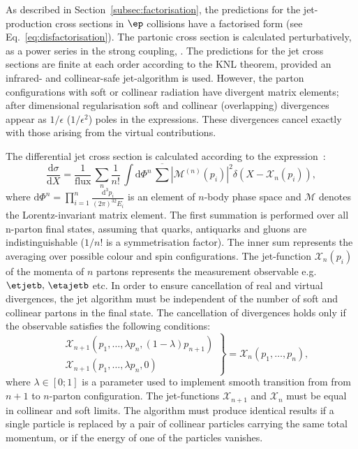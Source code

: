 As described in Section~\ref{subsec:factorisation}, the predictions for the jet-production cross sections in $\ep$ collisions have a factorised form (see Eq.~\eqref{eq:disfactorisation}). The partonic cross section is calculated perturbatively, as a power series in the strong coupling, \as. The predictions for the jet cross sections are finite at each order according to the KNL theorem\cite{Kinoshita:1962ur,Lee:1964is}, provided an infrared- and collinear-safe jet-algorithm is used. However, the parton configurations with soft or collinear radiation have divergent matrix elements; after dimensional regularisation soft and collinear (overlapping) divergences appear as $1/\epsilon$ ($1/\epsilon^2$) poles in the expressions. These divergences cancel exactly with those arising from the virtual contributions.

The differential jet cross section is calculated according to the expression~\cite{PDG:2014}:
\begin{equation}
\frac{\mathrm{d}\sigma}{\mathrm{d}X} = \frac{1}{\text{flux}}\, \sum_n{ \frac{1}{n!} \, \int{\mathrm{d}\Phi^{n}} \, \overline{\sum}{ \left| \mathcal{M}^{\left(n\right)}\left(p_i\right) \right|^2 } \delta\left( X - \mathcal{X}_n\left( p_i\right)\right)},
\label{eq:pqcdxs}
\end{equation}
where $\mathrm{d}\Phi^{n}=\prod_{i=1}^{n}\frac{\mathrm{d^3}p_i}{\left(2\pi\right)^32E_i}$ is an element of $n$-body phase space and $\mathcal{M}$ denotes the Lorentz-invariant matrix element. The first summation is performed over all n-parton final states, assuming that quarks, antiquarks and gluons are indistinguishable ($1/n!$ is a symmetrisation factor). The inner sum represents the averaging over possible colour and spin configurations. The jet-function $\mathcal{X}_n\left( p_i\right)$ of the momenta of $n$ partons represents the measurement observable e.g. $\etjetb,\,\etajetb$ etc. In order to ensure cancellation of real and virtual divergences, the jet algorithm must be independent of the number of soft and collinear partons in the final state. The cancellation of divergences holds only if the observable satisfies the following conditions:
\begin{equation}
\left.
\begin{aligned}
	&\mathcal{X}_{n+1}\left( p_1,\dots,\lambda p_n,\left(1-\lambda\right)p_{n+1}\right)\\
	&\mathcal{X}_{n+1}\left( p_1,\dots,\lambda p_n,0\right)
\end{aligned}
\right\} = \mathcal{X}_{n}\left( p_1,\dots, p_n\right),
\label{eq:jetfunccollimit}
\end{equation}
where $\lambda\in\left[0;1\right]$ is a parameter used to implement smooth transition from from $n+1$ to $n$-parton configuration. The jet-functions $\mathcal{X}_{n+1}$ and $\mathcal{X}_{n}$ must be equal in collinear and soft limits. The algorithm must produce identical results if a single particle is replaced by a pair of collinear particles carrying the same total momentum, or if the energy of one of the particles vanishes.

